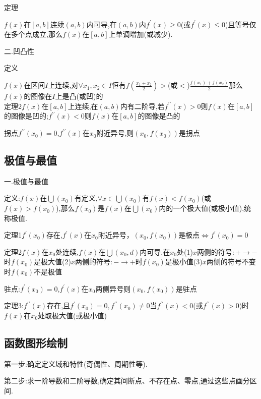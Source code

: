 \documentclass[utf8]{ctexart}
\begin{document}
定理

$f(x)$在$\left[a,b\right] $连续$(a,b)$内可导,在$(a,b)$内$f^\prime (x)\geqslant 0$(或$f^\prime (x)\leqslant 0$)且等号仅在多个点成立,那么$f(x)$在$\left[a,b\right] $上单调增加(或减少).

二.凹凸性

定义

$f(x)$在区间$I$上连续,对$\forall x_1,x_2 \in I$恒有$\displaystyle f(\frac{x_1+x_2}{2})>$(或$<$)$\displaystyle \frac{f(x_1)+f(x_2)}{2}$那么$f(x)$的图像在$I$上是凸(或凹)的\\

定理2$f(x)$在$\left[a,b\right]$上连续,在$(a,b)$内有二阶导,若$f^{\prime\prime}(x)>0$则$f(x)$在$\left[a,b\right] $的图像是凹的;$f^{\prime\prime}(x)<0$则$f(x)$在$\left[a,b\right] $的图像是凸的 

拐点$f^{\prime\prime}(x_0)=0$,$f^{\prime\prime}(x)$在$x_0$附近异号,则$(x_0,f(x_0))$是拐点\\

\subsection{\heiti 极值与最值}

一.极值与最值

定义:$f(x)$在$\bigcup (x_0)$有定义,$\forall x\in \bigcup (x_0)$有$f(x)<f(x_0)$(或$f(x)>f(x_0)$),那么$f(x_0)$是$f(x)$在$\bigcup (x_0)$内的一个极大值(或极小值),统称极值.

定理1$f^\prime(x_0)$存在,$f^{\prime}(x)$在$x_0$附近异号，$(x_0,f(x_0))$是极点$\Longleftrightarrow f^{\prime}(x_0)=0$

定理2$f(x)$在$x_0$处连续,$f(x)$在$\bigcup (x_0,d)$内可导,在$x_0$处(1)$x$两侧的符号$:+\to -$时$f(x_0)$是极大值(2)$x$两侧的符号$:-\to +$时$f(x_0)$是极小值(3)$x$两侧的符号不变时$f(x_0)$不是极值

驻点:$f^\prime(x_0)=0$,$f^\prime(x)$在$x_0$两侧异号则$(x_0,f(x_0))$是驻点

定理3:$f^{\prime\prime}(x)$存在,且$f^\prime(x_0)=0,f^{\prime\prime}(x_0)\neq 0$当$f^{\prime\prime}(x)<0$(或$f^{\prime\prime}(x)>0$)时$f(x)$在$x_0$处取极大值(或极小值)

\subsection{\heiti 函数图形绘制}

第一步:确定定义域和特性(奇偶性、周期性等).

第二步:求一阶导数和二阶导数,确定其间断点、不存在点、零点,通过这些点画分区间.
\end{document}
